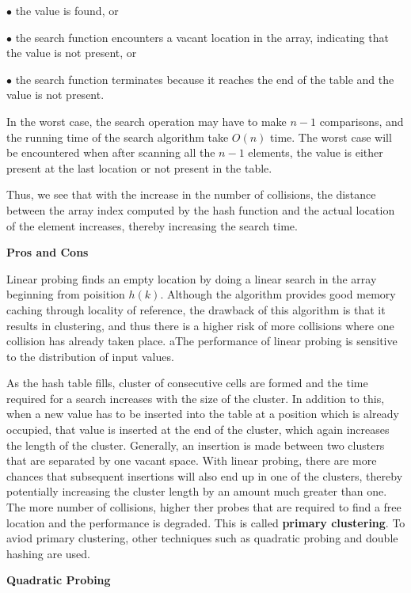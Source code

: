 \vskip 3mm
\qquad$\bullet$ the value is found, or

\vskip 3mm
\qquad$\bullet$ the search function encounters a vacant location in the array, indicating that the value is not present, or

\vskip 3mm
\qquad$\bullet$ the search function terminates because it reaches the end of the table and the value is not present.

\vskip 1mm
In the worst case, the search operation may have to make $n-1$ comparisons, and the running time of the search algorithm take $O(n)$ time. The worst case will be encountered when after scanning all the $n-1$ elements, the value is either present at the last location or not present in the table.

\vskip 1mm
Thus, we see that with the increase in the number of collisions, the distance between the array index computed by the hash function and the actual location of the element increases, thereby increasing the search time.

\filbreak
\vskip 3mm
{\bf Pros and Cons}

\vskip 1mm
Linear probing finds an empty location by doing a linear search in the array beginning from poisition $h(k)$. Although the algorithm provides good memory caching through locality of reference, the drawback of this algorithm is that it results in clustering, and thus there is a higher risk of more collisions where one collision has already taken place. aThe performance of linear probing is sensitive to the distribution of input values.

\vskip 1mm
As the hash table fills, cluster of consecutive cells are formed and the time required for a search increases with the size of the cluster. In addition to this, when a new value has to be inserted into the table at a position which is already occupied, that value is inserted at the end of the cluster, which again increases the length of the cluster. Generally, an insertion is made between two clusters that are separated by one vacant space. With linear probing, there are more chances that subsequent insertions will also end up in one of the clusters, thereby potentially increasing the cluster length by an amount much greater than one. The more number of collisions, higher ther probes that are required to find a free location and the performance is degraded. This is called {\bf primary clustering}. To aviod primary clustering, other techniques such as quadratic probing and double hashing are used.

\filbreak
\vskip 3mm
{\bf Quadratic Probing}

